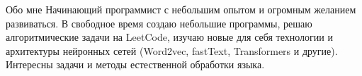 \begin{rubric}{Обо мне}
\entry*[]{}Начинающий программист с небольшим опытом и огромным желанием развиваться. В свободное время создаю небольшие программы, решаю алгоритмические задачи на LeetCode, изучаю новые для себя технологии и архитектуры нейронных сетей (Word2vec, fastText, Transformers и другие). Интересны задачи и методы естественной обработки языка.
\end{rubric}